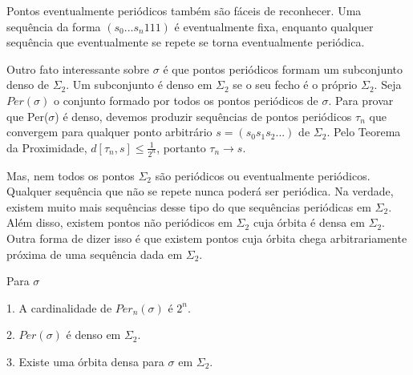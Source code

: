 \documentclass[../IC.tex]{subfiles}
\begin{document}
	\vspace{-\baselineskip}
	Pontos eventualmente periódicos também são fáceis de reconhecer. Uma sequência da forma $(s_0...s_n111)$ é eventualmente fixa, enquanto qualquer sequência que eventualmente se repete se torna eventualmente periódica.
	
	\vspace{-\baselineskip}
	Outro fato interessante sobre $\sigma$ é que pontos periódicos formam um subconjunto denso de $\Sigma_2$. Um subconjunto é denso em $\Sigma_2$ se o seu fecho é o próprio $\Sigma_2$. Seja $Per(\sigma)$ o conjunto formado por todos os pontos periódicos de $\sigma$. Para provar que Per($\sigma$) é denso, devemos produzir sequências de pontos periódicos $\tau_n$ que convergem para qualquer ponto arbitrário $s=(s_0s_1s_2...)$ de $\Sigma_2$. Pelo Teorema da Proximidade, $d[\tau_n,s]\leq \frac{1}{2^n}$, portanto $\tau_n \rightarrow s$.
	
	\vspace{-\baselineskip}
	Mas, nem todos os pontos $\Sigma_2$ são periódicos ou eventualmente periódicos. Qualquer sequência que não se repete nunca poderá ser periódica. Na verdade, existem muito mais sequências desse tipo do que sequências periódicas em $\Sigma_2$. Além disso, existem pontos não periódicos em $\Sigma_2$ cuja órbita é densa em $\Sigma_2$. Outra forma de dizer isso é que existem pontos cuja órbita chega arbitrariamente próxima de uma sequência dada em $\Sigma_2$.
	
	\begin{proposicao}\label{propriedadesDeSigma}
		Para $\sigma$
		
		1. A cardinalidade de $Per_n(\sigma)$ é $2^n$.
		
		2. $Per(\sigma)$ é denso em $\Sigma_2$.
		
		3. Existe uma órbita densa para $\sigma$ em $\Sigma_2$.
	\end{proposicao}
	
\end{document}
